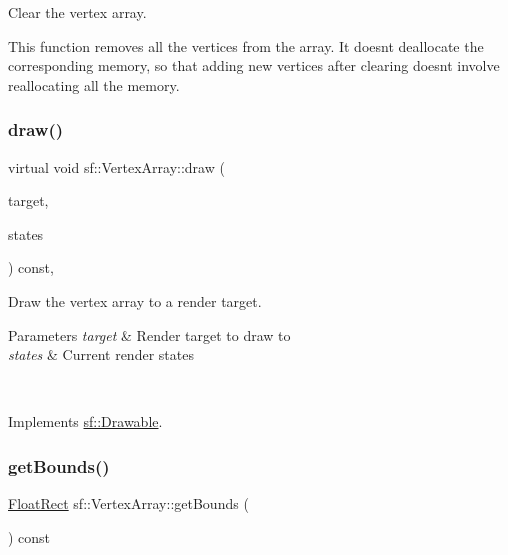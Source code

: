 Clear the vertex array. 

This function removes all the vertices from the array. It doesn\textquotesingle{}t deallocate the corresponding memory, so that adding new vertices after clearing doesn\textquotesingle{}t involve reallocating all the memory. \begin{DoxyVerb}\end{DoxyVerb}
 \mbox{\label{classsf_1_1_vertex_array_aa461f084e4a65fabfa4992885dabbea6}} 
\subsubsection{\texorpdfstring{draw()}{draw()}}
{\footnotesize\ttfamily virtual void sf\+::\+Vertex\+Array\+::draw (\begin{DoxyParamCaption}\item[{\mbox{\hyperlink{classsf_1_1_render_target}{Render\+Target}} \&}]{target,  }\item[{\mbox{\hyperlink{classsf_1_1_render_states}{Render\+States}}}]{states }\end{DoxyParamCaption}) const\hspace{0.3cm}{\ttfamily [private]}, {\ttfamily [virtual]}}



Draw the vertex array to a render target. 


\begin{DoxyParams}{Parameters}
{\em target} & Render target to draw to \\
\hline
{\em states} & Current render states \begin{DoxyVerb}\end{DoxyVerb}
 \\
\hline
\end{DoxyParams}


Implements \mbox{\hyperlink{classsf_1_1_drawable_a90d2c88bba9b035a0844eccb380ef631}{sf\+::\+Drawable}}.

\mbox{\label{classsf_1_1_vertex_array_abd57744c732abfc7d4c98d8e1d4ccca1}} 
\subsubsection{\texorpdfstring{getBounds()}{getBounds()}}
{\footnotesize\ttfamily \mbox{\hyperlink{classsf_1_1_rect}{Float\+Rect}} sf\+::\+Vertex\+Array\+::get\+Bounds (\begin{DoxyParamCaption}{ }\end{DoxyParamCaption}) const}



